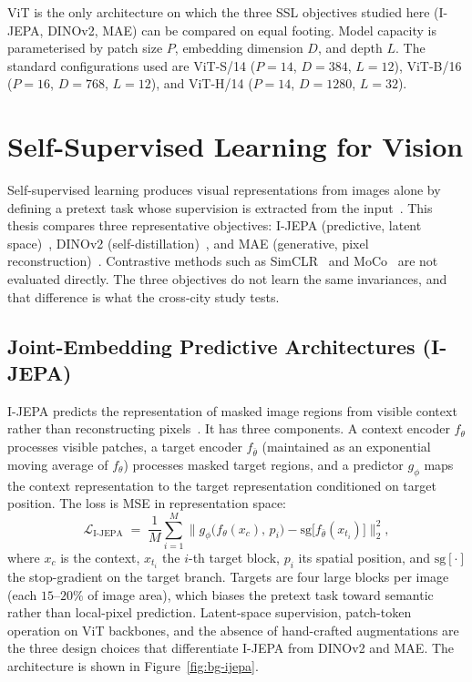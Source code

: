 ViT is the only architecture on which the three SSL objectives studied here (I-JEPA, DINOv2, MAE) can be compared on equal footing. Model capacity is parameterised by patch size $P$, embedding dimension $D$, and depth $L$. The standard configurations used are ViT-S/14 ($P{=}14$, $D{=}384$, $L{=}12$), ViT-B/16 ($P{=}16$, $D{=}768$, $L{=}12$), and ViT-H/14 ($P{=}14$, $D{=}1280$, $L{=}32$).

\section{Self-Supervised Learning for Vision}
\label{sec:bg-ssl}

Self-supervised learning produces visual representations from images alone by defining a pretext task whose supervision is extracted from the input~\cite{lecun-ssl-path-2022,balestriero-ssl-cookbook-2023}. This thesis compares three representative objectives: I-JEPA (predictive, latent space)~\cite{assran-ijepa-2023}, DINOv2 (self-distillation)~\cite{oquab-dinov2-2024,caron-dino-2021}, and MAE (generative, pixel reconstruction)~\cite{he-mae-2022}. Contrastive methods such as SimCLR~\cite{chen-simclr-2020} and MoCo~\cite{he-moco-2020} are not evaluated directly. The three objectives do not learn the same invariances, and that difference is what the cross-city study tests.

\subsection{Joint-Embedding Predictive Architectures (I-JEPA)}
\label{sec:bg-ijepa}

I-JEPA predicts the representation of masked image regions from visible context rather than reconstructing pixels~\cite{assran-ijepa-2023}. It has three components. A context encoder $f_\theta$ processes visible patches, a target encoder $f_{\bar\theta}$ (maintained as an exponential moving average of $f_\theta$) processes masked target regions, and a predictor $g_\phi$ maps the context representation to the target representation conditioned on target position. The loss is MSE in representation space:
\begin{equation}
\label{eq:ijepa-loss}
\mathcal{L}_{\text{I-JEPA}} \;=\; \frac{1}{M}\sum_{i=1}^{M} \bigl\| g_\phi\bigl(f_\theta(x_c),\, p_i\bigr) - \mathrm{sg}\bigl[f_{\bar\theta}(x_{t_i})\bigr] \bigr\|_2^2,
\end{equation}
where $x_c$ is the context, $x_{t_i}$ the $i$-th target block, $p_i$ its spatial position, and $\mathrm{sg}[\cdot]$ the stop-gradient on the target branch. Targets are four large blocks per image (each $15$--$20\%$ of image area), which biases the pretext task toward semantic rather than local-pixel prediction. Latent-space supervision, patch-token operation on ViT backbones, and the absence of hand-crafted augmentations are the three design choices that differentiate I-JEPA from DINOv2 and MAE. The architecture is shown in Figure~\ref{fig:bg-ijepa}.

